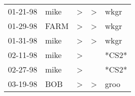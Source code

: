\begin{supertabular}{lllll}
 01-21-98 &  mike &  \textgreater &  \textgreater &   wkgr \\
 01-29-98 &  FARM &  \textgreater &  \textgreater &   wkgr \\
 01-31-98 &  mike &  \textgreater &  \textgreater &   wkgr \\
 02-11-98 &  mike &  \textgreater &               &  *CS2* \\
 02-27-98 &  mike &  \textgreater &               &  *CS2* \\
 03-19-98 &   BOB &  \textgreater &  \textgreater &   groo \\
\end{supertabular}
